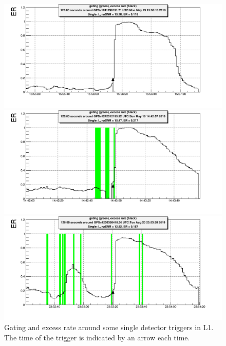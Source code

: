 \begin{figure}
  \centering
  \begin{minipage}{\linewidth}
    \centering
    \includegraphics[width=0.8\linewidth]{sectionSelection/plotsAroundSingles/1241798191-71_gatingER.png}
  \end{minipage}
% 
  \begin{minipage}{\linewidth}
    \centering
    \includegraphics[width=0.8\linewidth]{sectionSelection/plotsAroundSingles/1242312195-92_gatingER.png}
  \end{minipage}
% 
  \begin{minipage}{\linewidth}
    \centering
    \includegraphics[width=0.8\linewidth]{sectionSelection/plotsAroundSingles/1250380418-35_gatingER.png}
  \end{minipage}
  \caption{Gating and excess rate around some single detector triggers in L1. The time of the trigger is indicated by an arrow each time.}
  \label{fig:diagPlots}
\end{figure}

